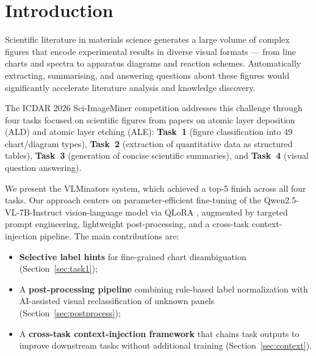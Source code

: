 \documentclass[11pt]{tibop-article}
\begin{document}
\maketitle

\section{Introduction}

Scientific literature in materials science generates a large volume of complex figures
that encode experimental results in diverse visual formats --- from line charts and
spectra to apparatus diagrams and reaction schemes.
Automatically extracting, summarising, and answering questions about these figures
would significantly accelerate literature analysis and knowledge discovery.

The ICDAR 2026 Sci-ImageMiner competition \cite{sciImageMiner2026} addresses this
challenge through four tasks focused on scientific figures from papers on atomic layer
deposition (ALD) and atomic layer etching (ALE):
\textbf{Task~1} (figure classification into 49 chart/diagram types),
\textbf{Task~2} (extraction of quantitative data as structured tables),
\textbf{Task~3} (generation of concise scientific summaries), and
\textbf{Task~4} (visual question answering).

We present the VLMinators system, which achieved a top-5 finish across all four tasks.
Our approach centers on parameter-efficient fine-tuning of the
Qwen2.5-VL-7B-Instruct vision-language model \cite{qwen25vl} via QLoRA \cite{qlora},
augmented by targeted prompt engineering, lightweight post-processing,
and a cross-task context-injection pipeline.
The main contributions are:
\begin{itemize}
  \item \textbf{Selective label hints} for fine-grained chart disambiguation
        (Section~\ref{sec:task1});
  \item A \textbf{post-processing pipeline} combining rule-based label normalization
        with AI-assisted visual reclassification of unknown panels (Section~\ref{sec:postprocess});
  \item A \textbf{cross-task context-injection framework} that chains task outputs
        to improve downstream tasks without additional training (Section~\ref{sec:context}).
\end{itemize}
\end{document}
